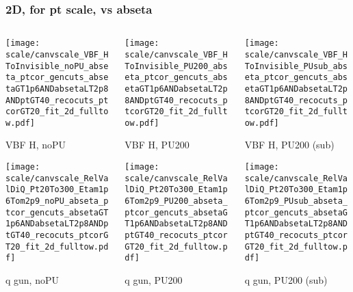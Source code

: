 \documentclass[8pt]{beamer}
\begin{document}
   \begin{frame}
  \frametitle{2D, for pt scale, vs abseta}
  
  \begin{columns}
   \begin{column}{0.35\textwidth}
     \texttt{[image: scale/canvscale\_VBF\_HToInvisible\_noPU\_abseta\_ptcor\_gencuts\_absetaGT1p6ANDabsetaLT2p8ANDptGT40\_recocuts\_ptcorGT20\_fit\_2d\_fulltow.pdf]}
     
     VBF H, noPU
    
     \texttt{[image: scale/canvscale\_RelValDiQ\_Pt20To300\_Etam1p6Tom2p9\_noPU\_abseta\_ptcor\_gencuts\_absetaGT1p6ANDabsetaLT2p8ANDptGT40\_recocuts\_ptcorGT20\_fit\_2d\_fulltow.pdf]}
     
     q gun, noPU
   \end{column}
   \begin{column}{0.35\textwidth}
     \texttt{[image: scale/canvscale\_VBF\_HToInvisible\_PU200\_abseta\_ptcor\_gencuts\_absetaGT1p6ANDabsetaLT2p8ANDptGT40\_recocuts\_ptcorGT20\_fit\_2d\_fulltow.pdf]}
     
     VBF H, PU200
    
     \texttt{[image: scale/canvscale\_RelValDiQ\_Pt20To300\_Etam1p6Tom2p9\_PU200\_abseta\_ptcor\_gencuts\_absetaGT1p6ANDabsetaLT2p8ANDptGT40\_recocuts\_ptcorGT20\_fit\_2d\_fulltow.pdf]}
     
     q gun, PU200
   \end{column}
   \begin{column}{0.35\textwidth}
     \texttt{[image: scale/canvscale\_VBF\_HToInvisible\_PUsub\_abseta\_ptcor\_gencuts\_absetaGT1p6ANDabsetaLT2p8ANDptGT40\_recocuts\_ptcorGT20\_fit\_2d\_fulltow.pdf]}
     
     VBF H, PU200 (sub)
    
     \texttt{[image: scale/canvscale\_RelValDiQ\_Pt20To300\_Etam1p6Tom2p9\_PUsub\_abseta\_ptcor\_gencuts\_absetaGT1p6ANDabsetaLT2p8ANDptGT40\_recocuts\_ptcorGT20\_fit\_2d\_fulltow.pdf]}
     
     q gun, PU200 (sub)
   \end{column}
  \end{columns}
 \end{frame}
 
\end{document}
